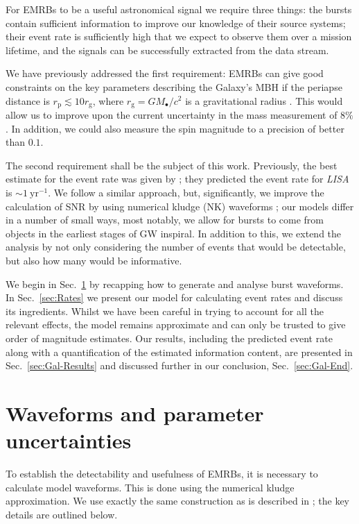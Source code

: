 \documentclass[useAMS,usedcolumn,usegraphicx,usenatbib]{mn2e}
\newcommand{\secref}[1]{Sec.~\ref{sec:#1}}
\newcommand{\units}[1]{\ensuremath{~\mathrm{#1}}}
\newcommand{\sub}[1]{\ensuremath{_\mathrm{#1}}}
\begin{document}
For EMRBs to be a useful astronomical signal we require three things: the bursts contain sufficient information to improve our knowledge of their source systems; their event rate is sufficiently high that we expect to observe them over a mission lifetime, and the signals can be successfully extracted from the data stream.

We have previously addressed the first requirement: EMRBs can give good constraints on the key parameters describing the Galaxy's MBH if the periapse distance is $r\sub{p} \lesssim 10 r\sub{g}$, where $r\sub{g} = GM_\bullet/c^2$ is a gravitational radius \citep{Berry2013}. This would allow us to improve upon the current uncertainty in the mass measurement of $8\%$ \citep{Gillessen2009}. In addition, we could also measure the spin magnitude to a precision of better than $0.1$.

The second requirement shall be the subject of this work. Previously, the best estimate for the event rate was given by \citet*{Hopman2007}; they predicted the event rate for \textit{LISA} is $\sim 1\units{yr^{-1}}$. We follow a similar approach, but, significantly, we improve the calculation of SNR by using numerical kludge (NK) waveforms \citep{Babak2007}; our models differ in a number of small ways, most notably, we allow for bursts to come from objects in the earliest stages of GW inspiral. In addition to this, we extend the analysis by not only considering the number of events that would be detectable, but also how many would be informative.

We begin in \secref{Waveforms} by recapping how to generate and analyse burst waveforms. In \secref{Rates} we present our model for calculating event rates and discuss its ingredients. Whilst we have been careful in trying to account for all the relevant effects, the model remains approximate and can only be trusted to give order of magnitude estimates. Our results, including the predicted event rate along with a quantification of the estimated information content, are presented in \secref{Gal-Results} and discussed further in our conclusion, \secref{Gal-End}.

\section{Waveforms and parameter uncertainties}\label{sec:Waveforms}

To establish the detectability and usefulness of EMRBs, it is necessary to calculate model waveforms. This is done using the numerical kludge approximation. We use exactly the same construction as is described in \citet{Berry2013}; the key details are outlined below.
\end{document}
